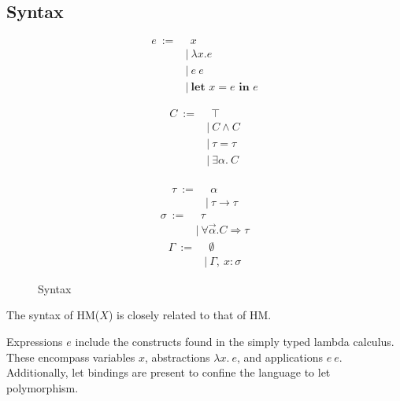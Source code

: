 \documentclass[runningheads]{llncs}
\newcommand{\hmx}{HM($X$)}
\newcommand{\kwlet}{\textbf{let }}
\newcommand{\kwin}{\textbf{ in }}
\begin{document}
\subsection{Syntax}
\begin{figure}[t]
  \centering
  \begin{subfigure}[t]{0.3\textwidth}
    \begin{align*}
      e \ := & \ \ x                    \\
             & | \ λx. e                \\
             & | \ e \ e                \\
             & | \ \kwlet x = e \kwin e
    \end{align*}
  \end{subfigure}
  \begin{subfigure}[t]{0.3\textwidth}
    \begin{align*}
      C \ := & \ \ ⊤       \\
             & | \ C ∧ C   \\
             & | \ τ = τ   \\
             & | \ ∃α. \ C \\
    \end{align*}
  \end{subfigure}
  \begin{subfigure}[t]{0.3\textwidth}
    \begin{align*}
      τ \ := & \ \ α     \\
             & | \ τ → τ
    \end{align*}
    \begin{align*}
      σ \ := & \ \ τ             \\
             & | \ ∀\Vec α.C ⇒ τ
    \end{align*}
    \begin{align*}
      Γ \ := & \ \ ∅           \\
             & | \ Γ , \ x : σ
    \end{align*}
  \end{subfigure}
  \caption{Syntax}
\end{figure}

The syntax of \hmx{} is closely related to that of HM.

Expressions $e$ include the constructs found in the simply typed lambda
calculus.
These encompass variables $x$, abstractions $λx. \ e$, and applications $e \
  e$.
Additionally, let bindings are present to confine the language to let
polymorphism.
\end{document}
